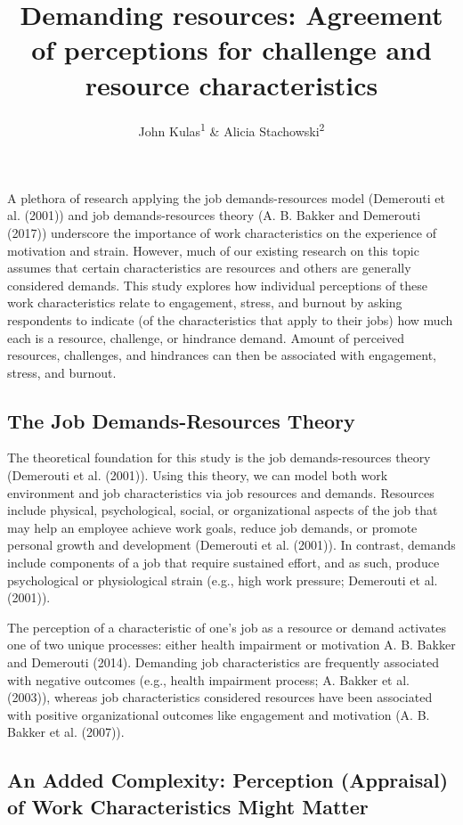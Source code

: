\documentclass[
  man]{apa6}
\title{Demanding resources: Agreement of perceptions for challenge and resource characteristics}
\author{John Kulas\textsuperscript{1} \& Alicia Stachowski\textsuperscript{2}}
\date{}
\affiliation{\vspace{0.5cm}\textsuperscript{1} eRg\\\textsuperscript{2} University of Wisconsin - Stout}
\begin{document}
\maketitle

A plethora of research applying the job demands-resources model (Demerouti et al. (2001)) and job demands-resources theory (A. B. Bakker and Demerouti (2017)) underscore the importance of work characteristics on the experience of motivation and strain. However, much of our existing research on this topic assumes that certain characteristics are resources and others are generally considered demands. This study explores how individual perceptions of these work characteristics relate to engagement, stress, and burnout by asking respondents to indicate (of the characteristics that apply to their jobs) how much each is a resource, challenge, or hindrance demand. Amount of perceived resources, challenges, and hindrances can then be associated with engagement, stress, and burnout.

\hypertarget{the-job-demands-resources-theory}{%
\subsection{The Job Demands-Resources Theory}\label{the-job-demands-resources-theory}}

The theoretical foundation for this study is the job demands-resources theory (Demerouti et al. (2001)). Using this theory, we can model both work environment and job characteristics via job resources and demands. Resources include physical, psychological, social, or organizational aspects of the job that may help an employee achieve work goals, reduce job demands, or promote personal growth and development (Demerouti et al. (2001)). In contrast, demands include components of a job that require sustained effort, and as such, produce psychological or physiological strain (e.g., high work pressure; Demerouti et al. (2001)).

The perception of a characteristic of one's job as a resource or demand activates one of two unique processes: either health impairment or motivation A. B. Bakker and Demerouti (2014). Demanding job characteristics are frequently associated with negative outcomes (e.g., health impairment process; A. Bakker et al. (2003)), whereas job characteristics considered resources have been associated with positive organizational outcomes like engagement and motivation (A. B. Bakker et al. (2007)).

\hypertarget{an-added-complexity-perception-appraisal-of-work-characteristics-might-matter}{%
\subsection{An Added Complexity: Perception (Appraisal) of Work Characteristics Might Matter}\label{an-added-complexity-perception-appraisal-of-work-characteristics-might-matter}}
\end{document}
